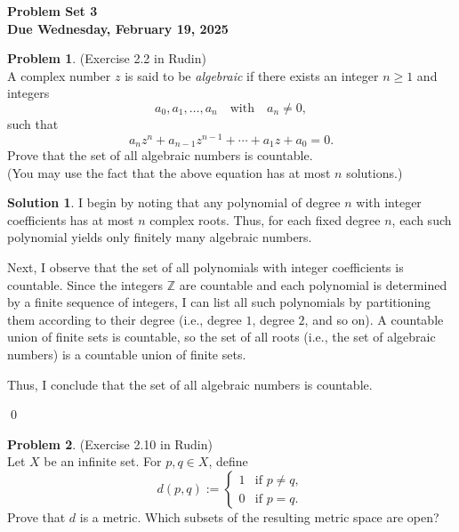 \documentclass[12pt,oneside]{article}
\theoremstyle{definition}
\newtheorem{problem}{Problem}
\newtheorem{solution}{Solution}
\begin{document}
\pagestyle{fancy}

\begin{center}
\bf \Large
Problem Set 3 \\[0.5em]
\large
Due Wednesday, February 19, 2025
\end{center}

\bigskip

\begin{problem}
(Exercise 2.2 in Rudin)\\[1mm]
A complex number \( z \) is said to be \emph{algebraic} if there exists an integer \( n \ge 1 \) and integers 
\[
a_0, a_1, \dots, a_n \quad \text{with} \quad a_n \neq 0,
\]
such that
\[
a_n z^n + a_{n-1}z^{n-1} + \cdots + a_1z + a_0 = 0.
\]
Prove that the set of all algebraic numbers is countable.\\[1mm]
(You may use the fact that the above equation has at most \( n \) solutions.)
\end{problem}
\newpage


\begin{solution}
I begin by noting that any polynomial of degree \( n \) with integer coefficients has at most \( n \) complex roots. Thus, for each fixed degree \( n \), each such polynomial yields only finitely many algebraic numbers.

Next, I observe that the set of all polynomials with integer coefficients is countable. Since the integers \( \mathbb{Z} \) are countable and each polynomial is determined by a finite sequence of integers, I can list all such polynomials by partitioning them according to their degree (i.e., degree \( 1 \), degree \( 2 \), and so on). A countable union of finite sets is countable, so the set of all roots (i.e., the set of algebraic numbers) is a countable union of finite sets.

Thus, I conclude that the set of all algebraic numbers is countable.

\qed
\end{solution}

\newpage
\begin{problem}
(Exercise 2.10 in Rudin)\\[1mm]
Let \( X \) be an infinite set. For \( p, q \in X \), define
\[
d(p,q) :=
\begin{cases}
1 & \text{if } p \neq q, \\
0 & \text{if } p = q.
\end{cases}
\]
Prove that \( d \) is a metric. Which subsets of the resulting metric space are open?
\end{problem}
\newpage
\end{document}
